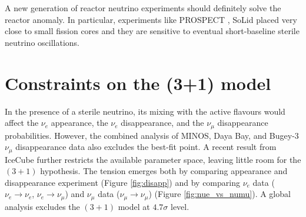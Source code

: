     A new generation of reactor neutrino experiments should definitely solve the reactor anomaly. In particular, experiments like PROSPECT \cite{Ashenfelter:2015uxt}, SoLid \cite{Abreu:2017bpe} \cite{Almazan:2018wln}  placed very close to small fission cores and they are sensitive to eventual short-baseline sterile neutrino oscillations.

\section{Constraints on the (3+1) model}

In the presence of a sterile neutrino, its mixing with the active flavours would affect the $\nu_e$ appearance, the $\nu_e$ disappearance, and the $\nu_{\mu}$ disappearance probabilities. However, the combined analysis of MINOS, Daya Bay, and Bugey-3 $\nu_{\mu}$ disappearance data \cite{Adamson:2016jku} also excludes the best-fit point. A recent result from IceCube \cite{TheIceCube:2016oqi} further restricts the available parameter space, leaving little room for the $(3+1)$ hypothesis. 
The tension emerges both by comparing appearance and disappearance experiment (Figure \ref{fig:disapp}) and by comparing $\nu_e$ data ($\nu_e\rightarrow\nu_e$, $\nu_e\rightarrow\nu_{\mu}$) and $\nu_{\mu}$ data ($\nu_{\mu}\rightarrow\nu_{\mu}$) (Figure \ref{fig:nue_vs_numu}). A global analysis \cite{Dentler:2018sju} excludes the $(3+1)$ model at $4.7\sigma$ level.

